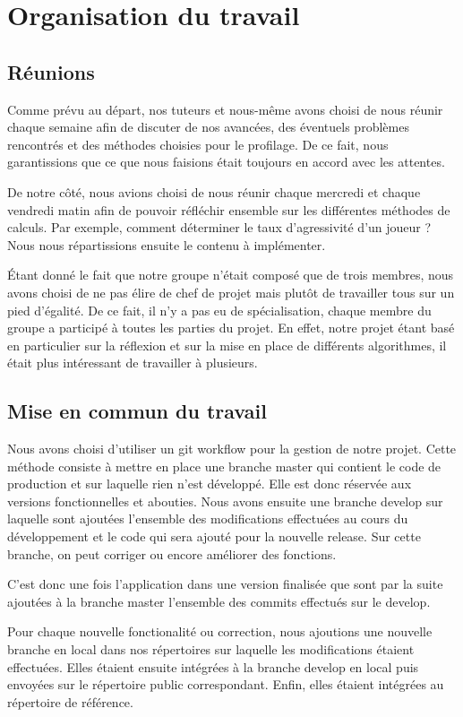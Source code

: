 \documentclass{report}
\begin{document}
\section{Organisation du travail}

\subsection{Réunions}
\hspace{0.5cm}Comme prévu au départ, nos tuteurs et nous-même avons choisi de nous réunir chaque semaine afin de discuter de nos avancées, des éventuels problèmes rencontrés et des méthodes choisies pour le profilage. De ce fait, nous garantissions que ce que nous faisions était toujours en accord avec les attentes.\par
De notre côté, nous avions choisi de nous réunir chaque mercredi et chaque vendredi matin afin de pouvoir réfléchir ensemble sur les différentes méthodes de calculs. Par exemple, comment déterminer le taux d'agressivité d'un joueur ? Nous nous répartissions ensuite le contenu à implémenter.\par
Étant donné le fait que notre groupe n'était composé que de trois membres, nous avons choisi de ne pas élire de chef de projet mais plutôt de travailler tous sur un pied d'égalité. De ce fait, il n'y a pas eu de spécialisation, chaque membre du groupe a participé à toutes les parties du projet. En effet, notre projet étant basé en particulier sur la réflexion et sur la mise en place de différents algorithmes, il était plus intéressant de travailler à plusieurs.\par

\subsection{Mise en commun du travail}
\hspace{0.5cm}Nous avons choisi d'utiliser un git workflow pour la gestion de notre projet. Cette méthode consiste à mettre en place une branche master qui contient le code de production et sur laquelle rien n'est développé. Elle est donc réservée aux versions fonctionnelles et abouties.
Nous avons ensuite une branche develop sur laquelle sont ajoutées l'ensemble des modifications effectuées au cours du développement et le code qui sera ajouté pour la nouvelle release. Sur cette branche, on peut corriger ou encore améliorer des fonctions. \par
C'est donc une fois l'application dans une version finalisée que sont par la suite ajoutées à la branche master l'ensemble des commits effectués sur le develop.\par
Pour chaque nouvelle fonctionalité ou correction, nous ajoutions une nouvelle branche en local dans nos répertoires sur laquelle les modifications étaient effectuées. Elles étaient ensuite intégrées à la branche develop en local puis envoyées sur le répertoire public correspondant. Enfin, elles étaient intégrées au répertoire de référence.\par
\end{document}
